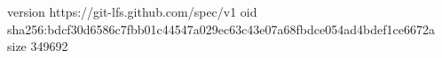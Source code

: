 version https://git-lfs.github.com/spec/v1
oid sha256:bdcf30d6586c7fbb01c44547a029ec63c43e07a68fbdce054ad4bdef1ce6672a
size 349692
